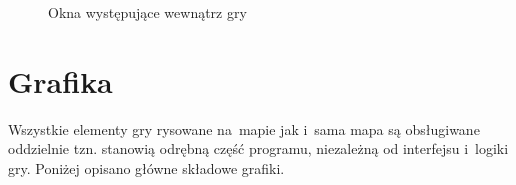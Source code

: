 \documentclass[licencjacka]{pracamgr}
\begin{document}
        \begin{figure}[h!]
          \centering
          \hspace{10mm}
          \caption{Okna występujące wewnątrz gry}
        \end{figure}

  \section{Grafika}
    Wszystkie elementy gry rysowane na~mapie jak i~sama mapa są obsługiwane oddzielnie tzn. stanowią odrębną część
    programu, niezależną od interfejsu i~logiki gry. Poniżej opisano główne składowe grafiki.
\end{document}
